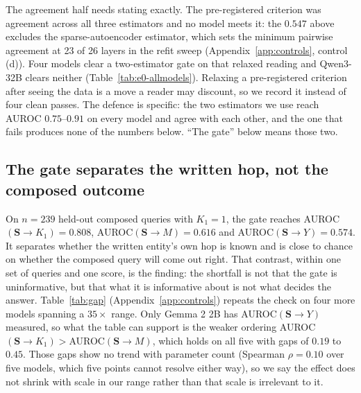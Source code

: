 \documentclass{article}
\newcommand{\gate}{\mathbf{S}}
\begin{document}
The agreement half needs stating exactly. The pre-registered criterion was agreement across all three
estimators and no model meets it: the $0.547$ above excludes the sparse-autoencoder estimator, which
sets the minimum pairwise agreement at 23 of 26 layers in the refit sweep (Appendix~\ref{app:controls},
control (d)). Four models clear a two-estimator gate on that relaxed reading and Qwen3-32B clears
neither (Table~\ref{tab:e0-allmodels}). Relaxing a pre-registered criterion after seeing the data is a
move a reader may discount, so we record it instead of four clean passes. The defence is specific: the
two estimators we use reach AUROC $0.75$--$0.91$ on every model and agree with each other, and the one
that fails produces none of the numbers below. ``The gate'' below means those two.

\subsection{The gate separates the written hop, not the composed outcome}
\label{sec:res-blindspot}

On $n=239$ held-out composed queries with $K_1=1$, the gate reaches AUROC$(\gate\!\to\!K_1)=0.808$,
AUROC$(\gate\!\to\!M)=0.616$ and AUROC$(\gate\!\to\!Y)=0.574$. It separates whether the written
entity's own hop is known and is close to chance on whether the composed query will come out right.
That contrast, within one set of queries and one score, is the finding: the shortfall is not that the
gate is uninformative, but that what it is informative about is not what decides the answer.
Table~\ref{tab:gap} (Appendix~\ref{app:controls}) repeats the check on four more models spanning a
$35\times$ range. Only Gemma 2 2B
has AUROC$(\gate\!\to\!Y)$ measured, so what the table can support is the weaker ordering
AUROC$(\gate\!\to\!K_1)>$AUROC$(\gate\!\to\!M)$, which holds on all five with gaps of $0.19$ to $0.45$.
Those gaps show no trend with parameter count (Spearman $\rho=0.10$ over five models, which five points
cannot resolve either way), so we say the effect does not shrink with scale in our range rather than
that scale is irrelevant to it.
\end{document}
